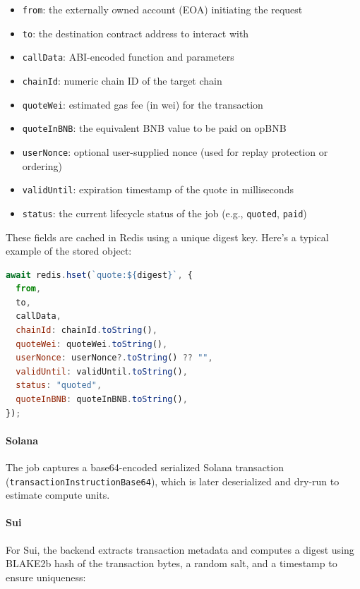 \documentclass{article}
\begin{document}
\begin{itemize}
  \item \texttt{from}: the externally owned account (EOA) initiating the request
  \item \texttt{to}: the destination contract address to interact with
  \item \texttt{callData}: ABI-encoded function and parameters
  \item \texttt{chainId}: numeric chain ID of the target chain
  \item \texttt{quoteWei}: estimated gas fee (in wei) for the transaction
  \item \texttt{quoteInBNB}: the equivalent BNB value to be paid on opBNB
  \item \texttt{userNonce}: optional user-supplied nonce (used for replay protection or ordering)
  \item \texttt{validUntil}: expiration timestamp of the quote in milliseconds
  \item \texttt{status}: the current lifecycle status of the job (e.g., \texttt{quoted}, \texttt{paid})
\end{itemize}

These fields are cached in Redis using a unique digest key. Here's a typical example of the stored object:

\begin{lstlisting}[language=JavaScript, caption={EVM Job Object Stored in Redis}]
await redis.hset(`quote:${digest}`, {
  from,
  to,
  callData,
  chainId: chainId.toString(),
  quoteWei: quoteWei.toString(),
  userNonce: userNonce?.toString() ?? "",
  validUntil: validUntil.toString(),
  status: "quoted",
  quoteInBNB: quoteInBNB.toString(),
});
\end{lstlisting}

\paragraph{Solana}
The job captures a base64-encoded serialized Solana transaction\\
(\texttt{transactionInstructionBase64}), which is later deserialized and dry-run to estimate compute units.

\paragraph{Sui}
For Sui, the backend extracts transaction metadata and computes a digest using BLAKE2b hash of the transaction bytes, a random salt, and a timestamp to ensure uniqueness:
\end{document}
